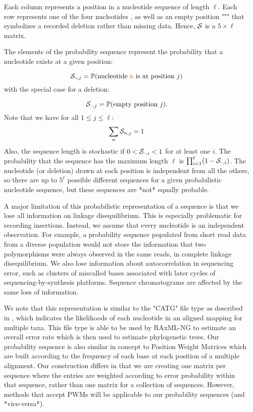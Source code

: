\documentclass[10pt]{article}
\begin{document}
Each column represents a position in a nucleotide sequence of length $\ell$.
Each row represents one of the four nucleotides , as well as an empty position "\sq{-}"" that symbolizes a recorded deletion rather than missing data.
Hence, $\mathcal{S}$ is a $5\times\ell$ matrix.



The elements of the probability sequence represent the probability that a nucleotide exists at a given position:

\begin{equation}
\mathcal{S}_{\texttt{\textcolor{brown}{n}},j} = \mathbb{P}(\text{nucleotide \texttt{\textcolor{brown}{n}} is at position }j)
\end{equation}
with the special case for a deletion:

\begin{equation}
\mathcal{S}_{\texttt{\textcolor{brown}{-}},j} = \mathbb{P}(\text{empty position }j).
\end{equation}
Note that we have for all $1\leq j \leq \ell$:
\begin{equation}
\sum_{n} \mathcal{S}_{n, j} = 1
\end{equation}
Also, the sequence length is stochastic if $0<\mathcal{S}_{\texttt{\textcolor{brown}{-}},i}<1$ for at least one $i$.
The probability that the sequence has the maximum length $\ell$ is $\prod_{i=1}^\ell (1-\mathcal{S}_{\texttt{\textcolor{brown}{-}},i})$.
The nucleotide (or deletion) drawn at each position is independent from all the others, so there are up to $5^\ell$ possible different sequences for a given probabilistic nucleotide sequence, but these sequences are *not* equally probable.


A major limitation of this probabilistic representation of a sequence is that we lose all information on linkage disequilibrium.
This is especially problematic for recording insertions.
Instead, we assume that every nucleotide is an independent observation.
For example, a probability sequence populated from short read data from a diverse population would not store the information that two polymorphisms were always observed in the same reads, \ie in complete linkage disequilibrium.
We also lose information about autocorrelation in sequencing error, such as clusters of miscalled bases associated with later cycles of sequencing-by-synthesis platforms.
Sequence chromatograms are affected by the same loss of information.

We note that this representation is similar to the "CATG" file type as described in \citet{kozlovModelsOptimizationsTools2018}, which indicates the likelihoods of each nucleotide in an aligned mapping for multiple taxa. 
This file type is able to be used by RAxML-NG to estimate an overall error rate which is then used to estimate phylogenetic trees.
Our probability sequence is also similar in concept to Position Weight Matrices \citep[PWMs, ]{stormoUsePerceptronAlgorithm1982} which are built according to the frequency of each base at each position of a multiple alignment. 
Our construction differs in that we are creating one matrix per sequence where the entries are weighted according to error probability within that sequence, rather than one matrix for a collection of sequences. 
However, methods that accept PWMs will be applicable to our probability sequences (and *vice-versa*).
\end{document}
